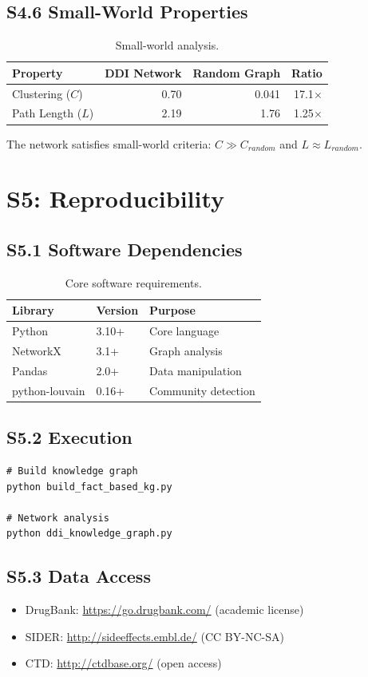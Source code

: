 \documentclass[11pt,a4paper]{article}
\begin{document}
\subsection{S4.6 Small-World Properties}

\begin{table}[H]
\centering
\caption{Small-world analysis.}
\begin{tabular}{@{}lrrr@{}}
\toprule
\textbf{Property} & \textbf{DDI Network} & \textbf{Random Graph} & \textbf{Ratio} \\
\midrule
Clustering ($C$) & 0.70 & 0.041 & 17.1$\times$ \\
Path Length ($L$) & 2.19 & 1.76 & 1.25$\times$ \\
\bottomrule
\end{tabular}
\end{table}

The network satisfies small-world criteria: $C \gg C_{random}$ and $L \approx L_{random}$.

\section{S5: Reproducibility}

\subsection{S5.1 Software Dependencies}

\begin{table}[H]
\centering
\caption{Core software requirements.}
\begin{tabular}{@{}lll@{}}
\toprule
\textbf{Library} & \textbf{Version} & \textbf{Purpose} \\
\midrule
Python & 3.10+ & Core language \\
NetworkX & 3.1+ & Graph analysis \\
Pandas & 2.0+ & Data manipulation \\
python-louvain & 0.16+ & Community detection \\
\bottomrule
\end{tabular}
\end{table}

\subsection{S5.2 Execution}

\begin{verbatim}
# Build knowledge graph
python build_fact_based_kg.py

# Network analysis
python ddi_knowledge_graph.py
\end{verbatim}

\subsection{S5.3 Data Access}

\begin{itemize}
    \item DrugBank: \url{https://go.drugbank.com/} (academic license)
    \item SIDER: \url{http://sideeffects.embl.de/} (CC BY-NC-SA)
    \item CTD: \url{http://ctdbase.org/} (open access)
\end{itemize}
\end{document}

